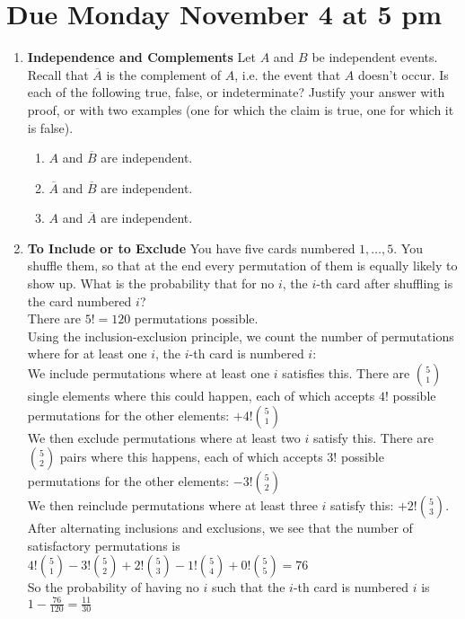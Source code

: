 \documentclass[11pt,fleqn]{article}
\begin{document}
\maketitle
\section*{Due Monday November 4 at 5 pm}

\newcommand{\p}[1]{\left(#1\right)}
\renewcommand{\gcd}[1]{\text{gcd}\p{#1}}
\renewcommand{\deg}[1]{\text{deg}\p{#1}}


\begin{enumerate}

\item \textbf{Independence and Complements}
Let $A$ and $B$ be independent events.
Recall that $\overline{A}$ is the complement of $A$,
i.e. the event that $A$ doesn't occur.
Is each of the following true, false, or indeterminate?
Justify your answer with proof,
or with two examples (one for which the claim is true, 
one for which it is false).
\begin{enumerate}
\item $A$ and $\overline{B}$ are independent.
\item $\overline{A}$ and $\overline{B}$ are independent.
\item $A$ and $\overline{A}$ are independent.
\end{enumerate}

\item \textbf{To Include or to Exclude} You have five cards numbered $1, \dots, 5$. You shuffle them, so that at the end every permutation of them is equally likely to show up. What is the probability that for no $i$, the $i$-th card after shuffling is the card numbered $i$? \\
There are $5! = 120$ permutations possible. \\
Using the inclusion-exclusion principle, we count the number of permutations where for at least one $i$, the $i$-th card is numbered $i$: \\
We include permutations where at least one $i$ satisfies this. There are $\binom51$ single elements where this could happen, each of which accepts $4!$ possible permutations for the other elements: $+4!\binom51$ \\
We then exclude permutations where at least two $i$ satisfy this. There are $\binom52$ pairs where this happens, each of which accepts $3!$ possible permutations for the other elements: $-3!\binom52$ \\
We then reinclude permutations where at least three $i$ satisfy this: $+2!\binom53$. \\
After alternating inclusions and exclusions, we see that the number of satisfactory permutations is $4!\binom51 - 3!\binom52 + 2!\binom53 - 1!\binom54 + 0!\binom55 = 76$ \\
So the probability of having no $i$ such that the $i$-th card is numbered $i$ is $1-\frac{76}{120} = \frac{11}{30}$


\end{enumerate}
\end{document}

